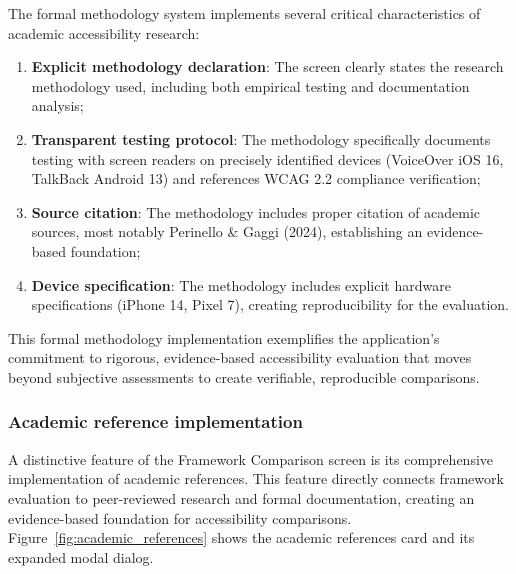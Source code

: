 The formal methodology system implements several critical characteristics of academic accessibility research:

\begin{enumerate}
    \item \textbf{Explicit methodology declaration}: The screen clearly states the research methodology used, including both empirical testing and documentation analysis;
    
    \item \textbf{Transparent testing protocol}: The methodology specifically documents testing with screen readers on precisely identified devices (VoiceOver iOS 16, TalkBack Android 13) and references WCAG 2.2 compliance verification;
    
    \item \textbf{Source citation}: The methodology includes proper citation of academic sources, most notably Perinello \& Gaggi (2024), establishing an evidence-based foundation;
    
    \item \textbf{Device specification}: The methodology includes explicit hardware specifications (iPhone 14, Pixel 7), creating reproducibility for the evaluation.
\end{enumerate}

This formal methodology implementation exemplifies the application's commitment to rigorous, evidence-based accessibility evaluation that moves beyond subjective assessments to create verifiable, reproducible comparisons.

\subsubsection{Academic reference implementation}

A distinctive feature of the Framework Comparison screen is its comprehensive implementation of academic references. This feature directly connects framework evaluation to peer-reviewed research and formal documentation, creating an evidence-based foundation for accessibility comparisons. Figure~\ref{fig:academic_references} shows the academic references card and its expanded modal dialog.

